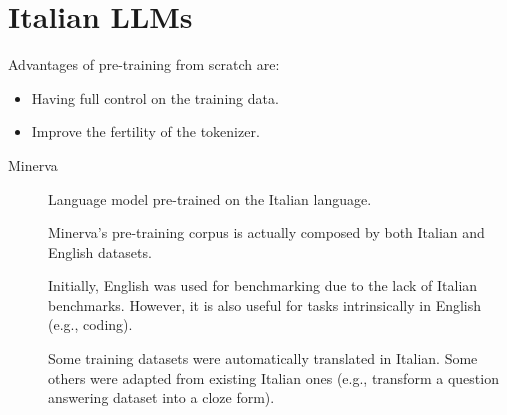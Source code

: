 \chapter{Italian LLMs}

\begin{remark}
    Advantages of pre-training from scratch are:
    \begin{itemize}
        \item Having full control on the training data.
        \item Improve the fertility of the tokenizer.
    \end{itemize} 
\end{remark}

\begin{description}
    \item[Minerva] 
        Language model pre-trained on the Italian language.

        \begin{remark}
            Minerva's pre-training corpus is actually composed by both Italian and English datasets.

            Initially, English was used for benchmarking due to the lack of Italian benchmarks. However, it is also useful for tasks intrinsically in English (e.g., coding).
        \end{remark}

        \begin{remark}
            Some training datasets were automatically translated in Italian. Some others were adapted from existing Italian ones (e.g., transform a question answering dataset into a cloze form).
        \end{remark}
\end{description}



